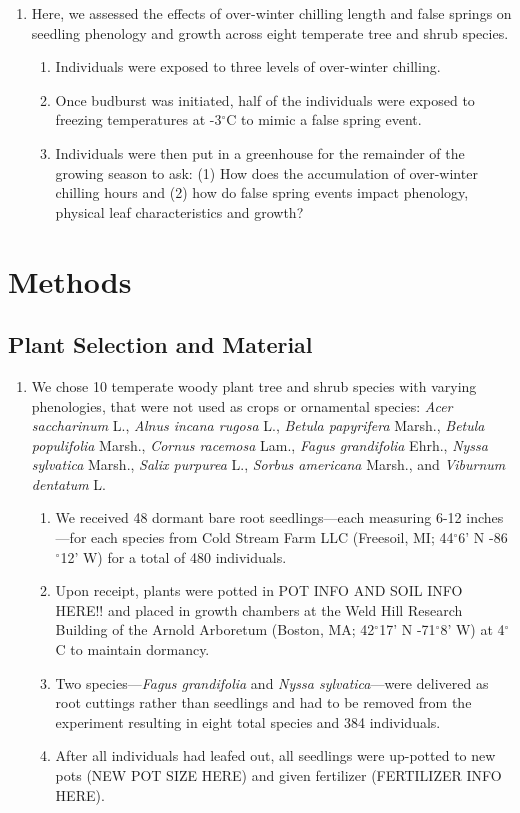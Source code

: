 \documentclass{article}\usepackage[]{graphicx}\usepackage[]{color}
\begin{document}
\begin{enumerate}
\item Here, we assessed the effects of over-winter chilling length and false springs on seedling phenology and growth across eight temperate tree and shrub species. 
  \begin{enumerate}
  \item Individuals were exposed to three levels of over-winter chilling. 
  \item Once budburst was initiated, half of the individuals were exposed to freezing temperatures at -3$^{\circ}$C to mimic a false spring event. 
  \item Individuals were then put in a greenhouse for the remainder of the growing season to ask: (1) How does the accumulation of over-winter chilling hours and (2) how do false spring events impact phenology, physical leaf characteristics and growth?
  \end{enumerate}
\end{enumerate}
  

\section*{Methods}
\subsection*{Plant Selection and Material}
\begin{enumerate}
\item We chose 10 temperate woody plant tree and shrub species with varying phenologies, that were not used as crops or ornamental species: \textit{Acer saccharinum} L., \textit{Alnus incana rugosa} L., \textit{Betula papyrifera} Marsh., \textit{Betula populifolia} Marsh., \textit{Cornus racemosa} Lam., \textit{Fagus grandifolia} Ehrh., \textit{Nyssa sylvatica} Marsh., \textit{Salix purpurea} L., \textit{Sorbus americana} Marsh., and \textit{Viburnum dentatum} L.
  \begin{enumerate}
  \item We received 48 dormant bare root seedlings---each measuring 6-12 inches---for each species from Cold Stream Farm LLC (Freesoil, MI; 44$^{\circ}$6' N -86$^{\circ}$12' W) for a total of 480 individuals.
  \item Upon receipt, plants were potted in POT INFO AND SOIL INFO HERE!! and placed in growth chambers at the Weld Hill Research Building of the Arnold Arboretum (Boston, MA; 42$^{\circ}$17' N -71$^{\circ}$8' W) at 4$^{\circ}$C to maintain dormancy.
  \item Two species---\textit{Fagus grandifolia} and \textit{Nyssa sylvatica}---were delivered as root cuttings rather than seedlings and had to be removed from the experiment resulting in eight total species and 384 individuals.
  \item After all individuals had leafed out, all seedlings were up-potted to new pots (NEW POT SIZE HERE) and given fertilizer (FERTILIZER INFO HERE).
  \end{enumerate}
\end{enumerate}
\end{document}
